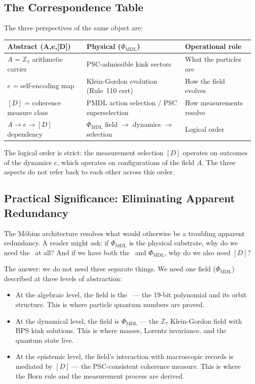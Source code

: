 \documentclass[11pt,openany]{book}
\theoremstyle{remark}
\newcommand{\PHIMDL}{\Phi_{\mathrm{MDL}}}
\newcommand{\ZS}{\mathbb{Z}_7}
\newcommand{\CMCA}{\text{CMCA}}
\begin{document}
\subsection*{The Correspondence Table}

The three perspectives of the same object are:

\begin{center}
\begin{tabular}{@{}P{3.5cm}P{5.0cm}P{4.0cm}@{}}
\toprule
\textbf{Abstract (A,e,[D])} & \textbf{Physical ($\PHIMDL$)} & \textbf{Operational role} \\
\midrule
$A$ = $\ZS$ arithmetic carrier & PSC-admissible kink sectors & What the particles are \\
$e$ = self-encoding map & Klein-Gordon evolution (Rule~110 cert) & How the field evolves \\
$[D]$ = coherence measure class & PMDL action selection / PSC superselection & How measurements resolve \\
\midrule
$A\to e\to [D]$ dependency & $\PHIMDL$ field $\to$ dynamics $\to$ selection & Logical order \\
\bottomrule
\end{tabular}
\end{center}

\noindent
The logical order is strict: the measurement selection $[D]$ operates on outcomes of
the dynamics $e$, which operates on configurations of the field $A$.
The three aspects do not refer back to each other across this order.

\subsection*{Practical Significance: Eliminating Apparent Redundancy}

The Möbius architecture resolves what would otherwise be a troubling apparent redundancy.
A reader might ask: if $\PHIMDL$ is the physical substrate, why do we need the \CMCA\
at all?
And if we have both the \CMCA\ and $\PHIMDL$, why do we also need $[D]$?

The answer: we do not need three separate things.
We need one field ($\PHIMDL$) described at three levels of abstraction:
\begin{itemize}[itemsep=3pt]
\item At the algebraic level, the field is the \CMCA\ --- the 19-bit polynomial and its
  orbit structure.
  This is where particle quantum numbers are proved.
\item At the dynamical level, the field is $\PHIMDL$ --- the $\ZS$ Klein-Gordon field with
  BPS kink solutions.
  This is where masses, Lorentz invariance, and the quantum state live.
\item At the epistemic level, the field's interaction with macroscopic records is
  mediated by $[D]$ --- the PSC-consistent coherence measure.
  This is where the Born rule and the measurement process are derived.
\end{itemize}
\end{document}
